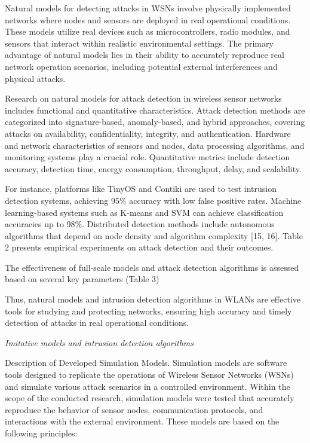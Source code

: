 \begin{multicols}{2}
Natural models for detecting attacks in WSNs involve physically
implemented networks where nodes and sensors are deployed in real
operational conditions. These models utilize real devices such as
microcontrollers, radio modules, and sensors that interact within
realistic environmental settings. The primary advantage of natural
models lies in their ability to accurately reproduce real network
operation scenarios, including potential external interferences and
physical attacks.

Research on natural models for attack detection in wireless sensor
networks includes functional and quantitative characteristics. Attack
detection methods are categorized into signature-based, anomaly-based,
and hybrid approaches, covering attacks on availability,
confidentiality, integrity, and authentication. Hardware and network
characteristics of sensors and nodes, data processing algorithms, and
monitoring systems play a crucial role. Quantitative metrics include
detection accuracy, detection time, energy consumption, throughput,
delay, and scalability.

For instance, platforms like TinyOS and Contiki are used to test
intrusion detection systems, achieving 95\% accuracy with low false
positive rates. Machine learning-based systems such as K-means and SVM
can achieve classification accuracies up to 98\%. Distributed detection
methods include autonomous algorithms that depend on node density and
algorithm complexity {[}15, 16{]}. Table 2 presents empirical
experiments on attack detection and their outcomes.

The effectiveness of full-scale models and attack detection algorithms is assessed based on several key parameters (Table 3) 

Thus, natural models and intrusion detection algorithms in WLANs are
effective tools for studying and protecting networks, ensuring high
accuracy and timely detection of attacks in real operational conditions.

\emph{Imitative models and intrusion detection algorithms}

Description of Developed Simulation Models. Simulation models are
software tools designed to replicate the operations of Wireless Sensor
Networks (WSNs) and simulate various attack scenarios in a controlled
environment. Within the scope of the conducted research, simulation
models were tested that accurately reproduce the behavior of sensor
nodes, communication protocols, and interactions with the external
environment. These models are based on the following principles:


\end{multicols}
